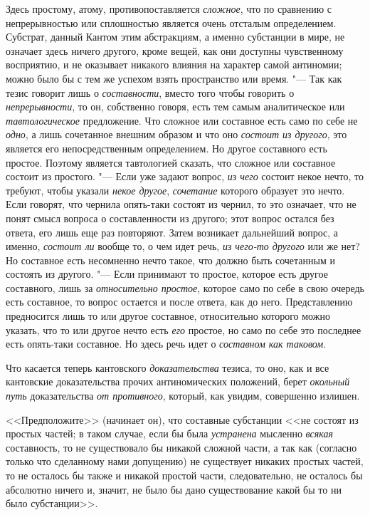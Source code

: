Здесь простому, атому, противопоставляется
{\em сложное}, что по сравнению с непрерывностью или
сплошностью является очень отсталым определением. Субстрат, данный Кантом
этим абстракциям, а именно субстанции в мире, не означает здесь ничего
другого, кроме вещей, как они доступны чувственному восприятию, и не
оказывает никакого влияния на характер самой антиномии; можно было бы с тем
же успехом взять пространство или время. "--- Так как тезис говорит лишь о
{\em составности}, вместо того чтобы говорить о
{\em непрерывности}, то он, собственно говоря, есть тем
самым аналитическое или {\em тавтологическое}
предложение. Что сложное или составное есть само по себе не
{\em одно}, а лишь сочетанное внешним образом и что оно
{\em состоит из другого}, это является его
непосредственным определением. Но другое составного есть простое. Поэтому
является тавтологией сказать, что сложное или составное состоит из
простого. "--- Если уже задают вопрос, {\em из чего}
состоит некое нечто, то требуют, чтобы указали
{\em некое другое}, {\em сочетание}
которого образует это нечто. Если говорят, что чернила опять-таки состоят
из чернил, то это означает, что не понят смысл вопроса о составленности из
другого; этот вопрос остался без ответа, его лишь еще раз повторяют. Затем
возникает дальнейший вопрос, а именно, {\em состоит ли}
вообще то, о чем идет речь, {\em из чего-то другого}
или же нет? Но составное есть несомненно нечто такое, что должно быть
сочетанным и состоять из другого. "--- Если принимают то простое, которое есть
другое составного, лишь за {\em относительно простое},
которое само по себе в свою очередь есть составное, то вопрос остается и
после ответа, как до него. Представлению предносится лишь то или другое
составное, относительно которого можно указать, что то или другое нечто
есть {\em его} простое, но само по себе это последнее
есть опять-таки составное. Но здесь речь идет о {\em составном как таковом}.

Что касается теперь кантовского {\em доказательства}
тезиса, то оно, как и все кантовские доказательства прочих антиномических
положений, берет {\em окольный путь} доказательства
{\em от противного}, который, как увидим, совершенно излишен.

<<Предположите>> (начинает он), что составные субстанции <<не состоят из
простых частей; в таком случае, если бы была {\em устранена} мысленно
{\em всякая} составность, то не существовало бы никакой
сложной части, а так как (согласно только что сделанному нами допущению) не
существует никаких простых частей, то не осталось бы также и никакой
простой части, следовательно, не осталось бы абсолютно ничего и, значит, не
было бы дано существование какой бы то ни было субстанции>>.

